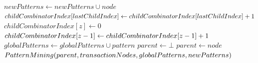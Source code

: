\documentclass{acm_proc_article-sp-sigmod09}
\begin{document}
\begin{algorithm}
\begin{algorithmic}[1]
                        \EndFor
                        \State $newPatterns \gets newPatterns \cup node$
                    \EndFor
                    \State $childCombinatorIndex[lastChildIndex] \gets child\-Com\-bi\-na\-tor\-Index[lastChildIndex] + 1$
                            \State $childCombinatorIndex[z] \gets 0$
                            \State $childCombinatorIndex[z - 1] \gets child\-Com\-bi\-na\-tor\-Index[z - 1] + 1$
                        \EndIf
                    \EndFor
                \EndWhile
            \EndFor
        \EndFor
    \EndFor
            \State $globalPatterns \gets globalPatterns \cup pattern$
        \EndIf
    \EndFor
    \State $parent \gets \bot$
            \State $parent \gets node$
        \EndIf
    \EndFor
        \State $PatternMining(pa\-rent, tran\-sac\-tion\-No\-des, global\-Patterns, new\-Patterns)$
    \EndIf
\EndIf
\EndFunction
\end{algorithmic}
\end{algorithm}
\end{document}
